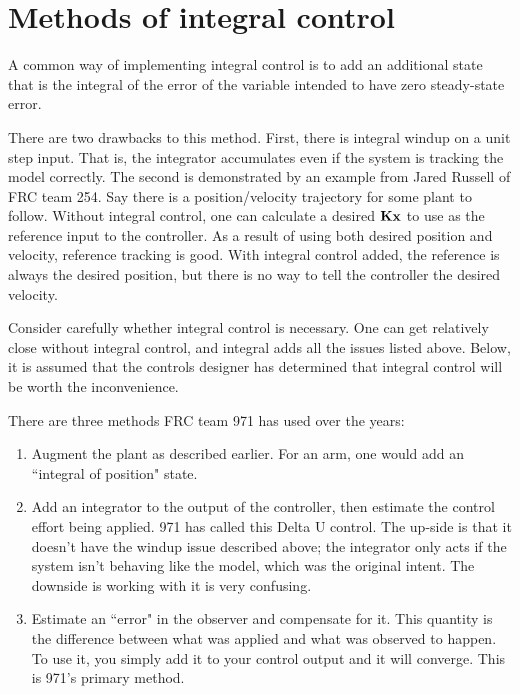 \chapter{Methods of integral control} \label{ch:integral-control}

A common way of implementing integral control is to add an additional state that
is the integral of the error of the variable intended to have zero steady-state
error.

There are two drawbacks to this method. First, there is integral windup on a
unit step input. That is, the integrator accumulates even if the system is
tracking the model correctly. The second is demonstrated by an example from
Jared Russell of FRC team 254. Say there is a position/velocity trajectory for
some plant to follow. Without integral control, one can calculate a desired
$\mathbf{K}\mathbf{x}$ to use as the reference input to the controller. As a result of
using both desired position and velocity, reference tracking is good. With
integral control added, the reference is always the desired position, but there
is no way to tell the controller the desired velocity.

Consider carefully whether integral control is necessary. One can get relatively
close without integral control, and integral adds all the issues listed above.
Below, it is assumed that the controls designer has determined that integral
control will be worth the inconvenience.

There are three methods FRC team 971 has used over the years:

\begin{enumerate}
  \item Augment the plant as described earlier. For an arm, one would add an
    ``integral of position" state.
  \item Add an integrator to the output of the controller, then estimate the
    control effort being applied. 971 has called this Delta U control. The
    up-side is that it doesn't have the windup issue described above; the
    integrator only acts if the system isn't behaving like the model, which was
    the original intent. The downside is working with it is very confusing.
  \item Estimate an ``error" in the observer and compensate for it. This
    quantity is the difference between what was applied and what was observed to
    happen. To use it, you simply add it to your control output and it will
    converge. This is 971's primary method.
\end{enumerate}

